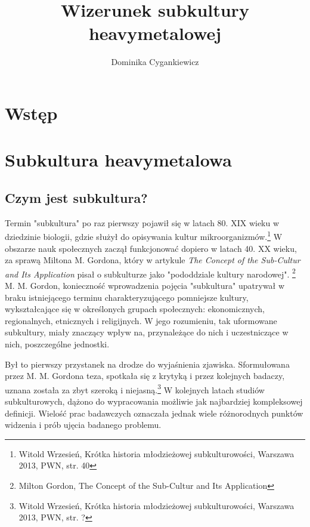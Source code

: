 \documentclass[12pt, a4paper, titlepage]{report}
\title{\textbf{Wizerunek subkultury heavymetalowej}}
\author{Dominika Cygankiewicz}
\date{}
\begin{document}
	
\maketitle
\tableofcontents
\thispagestyle {empty}
\newpage

\chapter*{Wstęp}

\chapter{Subkultura heavymetalowa}
\section{Czym jest subkultura?}
Termin "subkultura" po raz pierwszy pojawił się w latach 80. XIX wieku w dziedzinie biologii, gdzie służył do opisywania kultur mikroorganizmów.\footnote{Witold Wrzesień, Krótka historia młodzieżowej subkulturowości, Warszawa 2013, PWN, \break str. 40} W obszarze nauk społecznych zaczął funkcjonować dopiero w latach 40. XX wieku, za sprawą Miltona M. Gordona, który w artykule \textit{The Concept of the Sub-Cultur and Its Application} pisał o subkulturze jako "pododdziale kultury narodowej". \footnote{Milton Gordon, The Concept of the Sub-Cultur and Its Application} M. M. Gordon, konieczność wprowadzenia pojęcia "subkultura" upatrywał w braku istniejącego terminu charakteryzującego pomniejsze kultury, wykształcające się w określonych grupach społecznych: ekonomicznych, regionalnych, etnicznych i religijnych. W jego rozumieniu, tak uformowane subkultury, miały znaczący wpływ na, przynależące do nich i uczestniczące w nich, poszczególne jednostki. %


Był to pierwszy przystanek na drodze do wyjaśnienia zjawiska. Sformułowana przez M. M. Gordona teza, spotkała się z krytyką i przez kolejnych badaczy, uznana została za zbyt szeroką i niejasną.\footnote{Witold Wrzesień, Krótka historia młodzieżowej subkulturowości, Warszawa 2013, PWN, \break str. ?} W kolejnych latach studiów subkulturowych, dążono do wypracowania możliwie jak najbardziej kompleksowej definicji. Wielość prac badawczych oznaczała jednak wiele różnorodnych punktów widzenia i prób ujęcia badanego problemu. %
\end{document}
